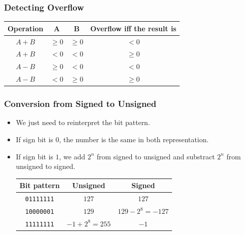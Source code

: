 \documentclass{beamer}
\begin{document}
\begin{frame}%
\frametitle{Detecting Overflow}

\begin{center}
\begin{tabular}{|c|c|c|c|}
\hline
Operation & A & B & Overflow iff the result is\\
\hline
\hline
$A+B$ & $\ge 0$ & $\ge 0$ & $< 0$\\
\hline
$A+B$ & $< 0$ & $< 0$ & $\ge 0$\\
\hline
$A-B$ & $\ge 0$ & $< 0$ & $< 0$\\
\hline
$A-B$ & $< 0$ & $\ge 0$ & $\ge 0$\\
\hline
\end{tabular}

\end{center}

\end{frame}

\begin{frame}%
\frametitle{Conversion from Signed to Unsigned}

\begin{itemize}

\item We just need to reinterpret the bit pattern.

\vspace{0.3cm}

\item If sign bit is $0$, the number is the same in both representation.

\vspace{0.3cm}

\item If sign bit is $1$, we add $2^{n}$ from signed to unsigned and substract
  $2^{n}$ from unsigned to signed.

\vspace{0.3cm}

  \begin{tabular}{|c|c|c|}
    \hline
    Bit pattern & Unsigned & Signed\\
    \hline
    \hline
    \texttt{01111111} & $127$ & $127$\\
    \hline
    \texttt{10000001} & $129$ & $129 - 2^8 = -127$\\
    \hline
    \texttt{11111111} & $-1 + 2^8 = 255$ & $-1$\\
    \hline
  \end{tabular}
\end{itemize}

\end{frame}
\end{document}
